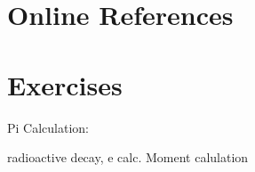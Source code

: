 




\section{Online References}
\label{sec:Online_Refernces}


\section{Exercises}
Pi Calculation:


radioactive decay, e calc.
Moment calulation


\nocite{FLANAGAN-EXAMPLES}
\nocite{GOSLING}







